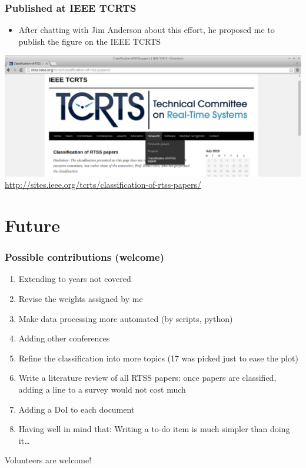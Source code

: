 \documentclass[ignorenonframetext,mathserif]{beamer} %
\begin{document}
\begin{frame}
  \frametitle{Published at IEEE TCRTS}
  \begin{itemize}
  \item After chatting with Jim Anderson about this effort, he
    proposed me to publish the figure on the IEEE TCRTS
  \end{itemize}
  \begin{center}
    \includegraphics[scale=.32]{figs/tcrts_screen}\\
    \url{http://sites.ieee.org/tcrts/classification-of-rtss-papers/}
  \end{center}
\end{frame}

\section{Future}

\begin{frame}
  \frametitle{Possible contributions (welcome)}
  \begin{enumerate}
  \item Extending to years not covered
  \item Revise the weights assigned by me
  \item Make data processing more automated (by scripts, python)
  \item Adding other conferences
  \item Refine the classification into more topics (17 was picked just
    to ease the plot)
  \item Write a literature review of all RTSS papers: once papers are
    classified, adding a line to a survey would not cost much
  \item Adding a DoI to each document
  \item Having well in mind that: Writing a to-do item is much simpler
    than doing it\dots
  \end{enumerate}
  \pause
  \begin{center}
    \Large
    Volunteers are welcome!
  \end{center}
\end{frame}
\end{document}

